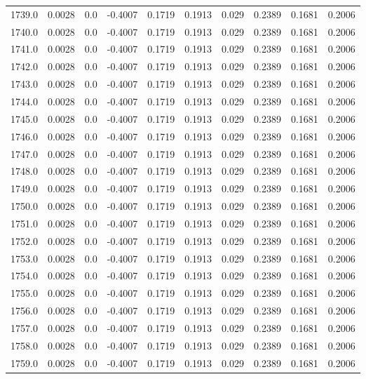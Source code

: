 \begin{longtable}{lrrrrrrrrr}
1739.0 & 0.0028 & 0.0 & -0.4007 & 0.1719 & 0.1913 & 0.029 & 0.2389 & 0.1681 & 0.2006 \\
1740.0 & 0.0028 & 0.0 & -0.4007 & 0.1719 & 0.1913 & 0.029 & 0.2389 & 0.1681 & 0.2006 \\
1741.0 & 0.0028 & 0.0 & -0.4007 & 0.1719 & 0.1913 & 0.029 & 0.2389 & 0.1681 & 0.2006 \\
1742.0 & 0.0028 & 0.0 & -0.4007 & 0.1719 & 0.1913 & 0.029 & 0.2389 & 0.1681 & 0.2006 \\
1743.0 & 0.0028 & 0.0 & -0.4007 & 0.1719 & 0.1913 & 0.029 & 0.2389 & 0.1681 & 0.2006 \\
1744.0 & 0.0028 & 0.0 & -0.4007 & 0.1719 & 0.1913 & 0.029 & 0.2389 & 0.1681 & 0.2006 \\
1745.0 & 0.0028 & 0.0 & -0.4007 & 0.1719 & 0.1913 & 0.029 & 0.2389 & 0.1681 & 0.2006 \\
1746.0 & 0.0028 & 0.0 & -0.4007 & 0.1719 & 0.1913 & 0.029 & 0.2389 & 0.1681 & 0.2006 \\
1747.0 & 0.0028 & 0.0 & -0.4007 & 0.1719 & 0.1913 & 0.029 & 0.2389 & 0.1681 & 0.2006 \\
1748.0 & 0.0028 & 0.0 & -0.4007 & 0.1719 & 0.1913 & 0.029 & 0.2389 & 0.1681 & 0.2006 \\
1749.0 & 0.0028 & 0.0 & -0.4007 & 0.1719 & 0.1913 & 0.029 & 0.2389 & 0.1681 & 0.2006 \\
1750.0 & 0.0028 & 0.0 & -0.4007 & 0.1719 & 0.1913 & 0.029 & 0.2389 & 0.1681 & 0.2006 \\
1751.0 & 0.0028 & 0.0 & -0.4007 & 0.1719 & 0.1913 & 0.029 & 0.2389 & 0.1681 & 0.2006 \\
1752.0 & 0.0028 & 0.0 & -0.4007 & 0.1719 & 0.1913 & 0.029 & 0.2389 & 0.1681 & 0.2006 \\
1753.0 & 0.0028 & 0.0 & -0.4007 & 0.1719 & 0.1913 & 0.029 & 0.2389 & 0.1681 & 0.2006 \\
1754.0 & 0.0028 & 0.0 & -0.4007 & 0.1719 & 0.1913 & 0.029 & 0.2389 & 0.1681 & 0.2006 \\
1755.0 & 0.0028 & 0.0 & -0.4007 & 0.1719 & 0.1913 & 0.029 & 0.2389 & 0.1681 & 0.2006 \\
1756.0 & 0.0028 & 0.0 & -0.4007 & 0.1719 & 0.1913 & 0.029 & 0.2389 & 0.1681 & 0.2006 \\
1757.0 & 0.0028 & 0.0 & -0.4007 & 0.1719 & 0.1913 & 0.029 & 0.2389 & 0.1681 & 0.2006 \\
1758.0 & 0.0028 & 0.0 & -0.4007 & 0.1719 & 0.1913 & 0.029 & 0.2389 & 0.1681 & 0.2006 \\
1759.0 & 0.0028 & 0.0 & -0.4007 & 0.1719 & 0.1913 & 0.029 & 0.2389 & 0.1681 & 0.2006 \\

\end{longtable}
